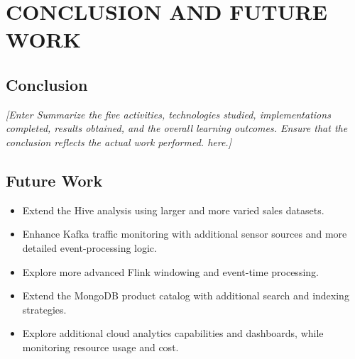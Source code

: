 \documentclass[12pt,a4paper]{report}
\newcommand{\placeholder}[1]{\textit{[Enter #1 here.]}}
\begin{document}
\chapter{CONCLUSION AND FUTURE WORK}

\section{Conclusion}
\placeholder{Summarize the five activities, technologies studied,
implementations completed, results obtained, and the overall learning
outcomes. Ensure that the conclusion reflects the actual work performed.}

\section{Future Work}
\begin{itemize}
    \item Extend the Hive analysis using larger and more varied sales datasets.
    \item Enhance Kafka traffic monitoring with additional sensor sources and
    more detailed event-processing logic.
    \item Explore more advanced Flink windowing and event-time processing.
    \item Extend the MongoDB product catalog with additional search and
    indexing strategies.
    \item Explore additional cloud analytics capabilities and dashboards,
    while monitoring resource usage and cost.
\end{itemize}
\end{document}

